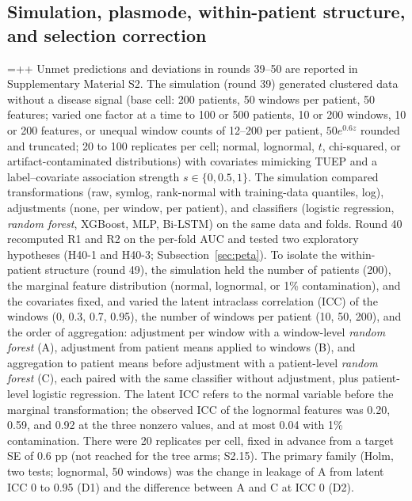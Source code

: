 \subsection{Simulation, plasmode, within-patient structure, and selection correction}\label{sec:metode_peta}

\begingroup\emergencystretch=\dimexpr\baselineskip+\baselineskip+\baselineskip\relax
Unmet predictions and deviations in rounds 39--50 are reported in Supplementary Material S2.
The simulation (round 39) generated clustered data without a disease signal (base cell: 200 patients, 50 windows per patient, 50 features; varied one factor at a time to 100 or 500 patients, 10 or 200 windows, 10 or 200 features, or unequal window counts of 12--200 per patient, $50e^{0.6z}$ rounded and truncated; 20 to 100 replicates per cell; normal, lognormal, $t$, chi-squared, or artifact-contaminated distributions) with covariates mimicking TUEP and a label--covariate association strength $s\in\{0,0.5,1\}$. The simulation compared transformations (raw, symlog, rank-normal with training-data quantiles, log), adjustments (none, per window, per patient), and classifiers (logistic regression, \textit{random forest}, XGBoost, MLP, Bi-LSTM) on the same data and folds.
Round 40 recomputed R1 and R2 on the per-fold AUC and tested two exploratory hypotheses (H40-1 and H40-3; Subsection~\ref{sec:peta}).
To isolate the within-patient structure (round 49), the simulation held the number of patients (200), the marginal feature distribution (normal, lognormal, or 1\% contamination), and the covariates fixed, and varied the latent intraclass correlation (ICC) of the windows (0, 0.3, 0.7, 0.95), the number of windows per patient (10, 50, 200), and the order of aggregation: adjustment per window with a window-level \textit{random forest} (A), adjustment from patient means applied to windows (B), and aggregation to patient means before adjustment with a patient-level \textit{random forest} (C), each paired with the same classifier without adjustment, plus patient-level logistic regression. The latent ICC refers to the normal variable before the marginal transformation; the observed ICC of the lognormal features was 0.20, 0.59, and 0.92 at the three nonzero values, and at most 0.04 with 1\% contamination. There were 20 replicates per cell, fixed in advance from a target SE of 0.6 pp (not reached for the tree arms; S2.15). The primary family (Holm, two tests; lognormal, 50 windows) was the change in leakage of A from latent ICC 0 to 0.95 (D1) and the difference between A and C at ICC 0 (D2).
